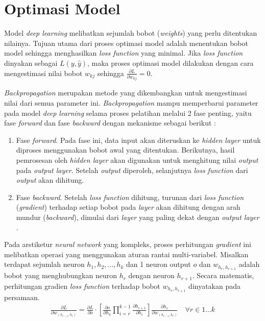 \documentclass[a4paper,12pt]{report}
\begin{document}
\section{Optimasi Model}
Model \textit{deep learning} melibatkan sejumlah bobot (\textit{weights}) yang perlu ditentukan nilainya. Tujuan utama dari proses optimasi model adalah menentukan bobot model sehingga menghasilkan \textit{loss function} yang minimal. Jika \textit{loss function} dinyakan sebagai $L(y, \hat{y})$, maka proses optimasi model dilakukan dengan cara mengestimasi nilai bobot $w_{kj}$ sehingga $\frac{\partial L}{\partial w_{kj}} = 0$. 

\textit{Backpropagation} merupakan metode yang dikembangkan untuk mengestimasi nilai dari semua parameter ini. \textit{Backpropagation} mampu memperbarui parameter pada model \textit{deep learning} selama proses pelatihan melalui 2 fase penting, yaitu fase \textit{forward} dan fase \textit{backward} dengan mekanisme sebagai berikut \cite{montesinoslopezMultivariateStatisticalMachine2022}\cite{pajankarHandsonMachineLearning2022}: 
\begin{enumerate}
	\item Fase \textit{forward}. Pada fase ini, data input akan diteruskan ke \textit{hidden layer} untuk diproses menggunakan bobot awal yang ditentukan. Berikutnya, hasil pemrosesan oleh \textit{hidden layer} akan digunakan untuk menghitung nilai \textit{output} pada \textit{output layer}. Setelah \textit{output} diperoleh, selanjutnya \textit{loss function} dari \textit{output} akan dihitung.
	\item Fase \textit{backward}. Setelah \textit{loss function} dihitung, turunan dari \textit{loss function} (\textit{gradient}) terhadap setiap bobot pada \textit{layer} akan dihitung dengan arah mundur (\textit{backward}), dimulai dari \textit{layer} yang paling dekat dengan \textit{output layer} \cite{aggarwalNeuralNetworksDeep2018}.  
\end{enumerate}

Pada arstiketur \textit{neural network} yang kompleks, proses perhitungan \textit{gradient} ini melibatkan operasi yang menggunakan aturan rantai multi-variabel. Misalkan terdapat sejumlah neuron $h_1, h_2, ..., h_k$ dan 1 neuron output $o$ dan $w_{h_r, h_{r+1}}$ adalah bobot yang menghubungkan neuron $h_r$ dengan neuron $h_{r+1}$. Secara matematis, perhitungan gradien \textit{loss function} terhadap bobot $w_{h_r, h_{r+1}}$ dinyatakan pada persamaan.
\begin{equation}
	\begin{split}
		\frac{\partial L}{\partial w_{(h_{r-1},h_r)}} = \frac{\partial L}{\partial o} \cdot \left[ \frac{\partial o}{\partial h_k} \prod_{i=r}^{k-1} \frac{\partial h_{i+1}}{\partial h_i} \right] \frac{\partial h_r}{\partial w_{(h_{r-1},h_r)}} \quad \forall r \in 1...k \\
	\end{split}
	\label{bpformula}
\end{equation}
\end{document}
